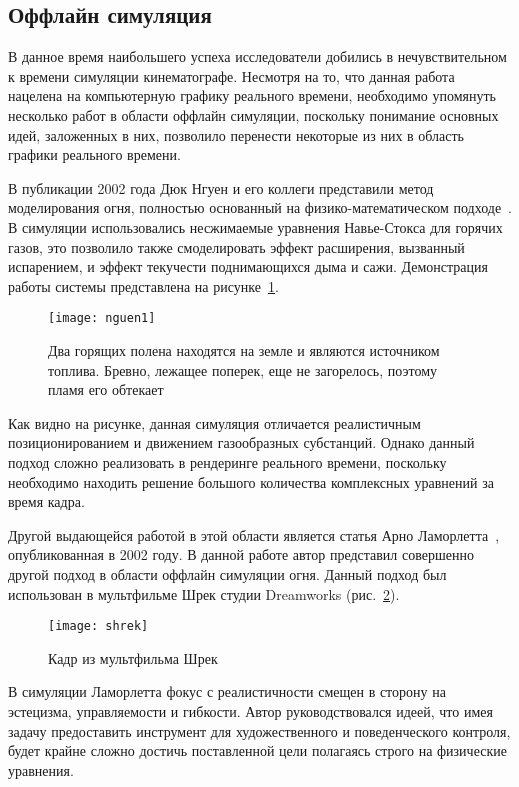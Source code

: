 \subsection{Оффлайн симуляция}

В данное время наибольшего успеха исследователи добились в нечувствительном к
времени симуляции кинематографе. Несмотря на то, что данная работа нацелена на
компьютерную графику реального времени, необходимо упомянуть несколько работ в
области оффлайн симуляции, поскольку понимание основных идей, заложенных в них,
позволило перенести некоторые из них в область графики реального времени.

В публикации 2002 года Дюк Нгуен и его коллеги представили метод моделирования
огня, полностью основанный на физико-математическом подходе~\cite{nguen2002}. В
симуляции использовались несжимаемые уравнения Навье-Стокса для горячих газов,
это позволило также смоделировать эффект расширения, вызванный испарением, и
эффект текучести поднимающихся дыма и сажи. Демонстрация работы системы
представлена на рисунке~\ref{fig:nguen}.
\begin{figure}[htb]
	\centering
	\texttt{[image: nguen1]}
    \caption{Два горящих полена находятся на земле и являются источником
    топлива. Бревно, лежащее поперек, еще не загорелось, поэтому пламя его
обтекает}%
    \label{fig:nguen}
\end{figure}

Как видно на рисунке, данная симуляция отличается реалистичным
позиционированием и движением газообразных субстанций. Однако данный подход
сложно реализовать в рендеринге реального времени, поскольку необходимо находить
решение большого количества комплексных уравнений за время кадра.

Другой выдающейся работой в этой области является статья Арно
Ламорлетта~\cite{Lamorlette}, опубликованная в 2002 году. В данной работе автор
представил совершенно другой подход в области оффлайн симуляции огня. Данный
подход был использован в мультфильме Шрек студии Dreamworks
(рис.~\ref{fig:shrek}).
\begin{figure}[htb]
	\centering
	\texttt{[image: shrek]}
    \caption{Кадр из мультфильма Шрек}%
    \label{fig:shrek}
\end{figure}
В симуляции Ламорлетта фокус с реалистичности смещен в сторону на эстецизма,
управляемости и гибкости. Автор руководствовался идеей, что имея задачу
предоставить инструмент для художественного и поведенческого контроля, будет
крайне сложно достичь поставленной цели полагаясь строго на физические
уравнения.

